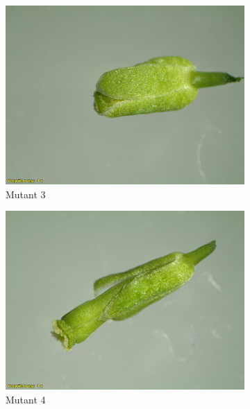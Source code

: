\documentclass[10pt,a4paper]{article}
\begin{document}
\begin{figure}[H]
\begin{subfigure}[b]{0.45\textwidth}
			\end{subfigure}
			\hfill
			\begin{subfigure}[b]{0.45\textwidth}
				\includegraphics[width=\textwidth]{3_O+A(MU).jpg}
				\caption{Mutant 3}
				\label{fig:M3}
			\end{subfigure}
			\hfill
			\begin{subfigure}[b]{0.45\textwidth}
				\includegraphics[width=\textwidth]{4_O+A(MU).jpg}
				\caption{Mutant 4}
				\label{fig:M4}
			\end{subfigure}
			\hfill
			\begin{subfigure}[b]{0.45\textwidth}
				\centering

\end{subfigure}
\end{figure}
\end{document}
